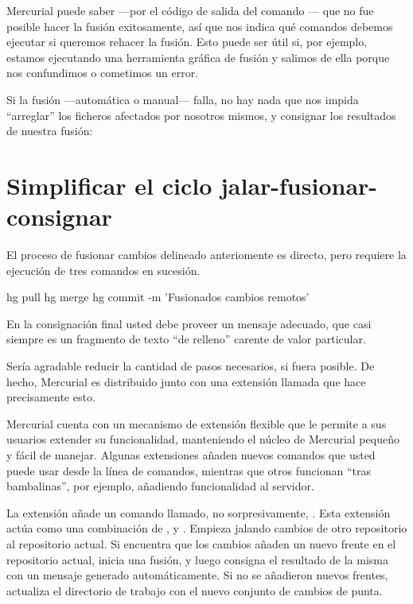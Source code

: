 Mercurial puede saber ---por el código de salida del comando
--- que no fue posible hacer la fusión exitosamente,
así que nos indica qué comandos debemos ejecutar si queremos rehacer
la fusión. Esto puede ser útil si, por ejemplo, estamos ejecutando una
herramienta gráfica de fusión y salimos de ella porque nos confundimos
o cometimos un error.

Si la fusión ---automática o manual--- falla, no hay nada que nos
impida ``arreglar'' los ficheros afectados por nosotros mismos, y
consignar los resultados de nuestra fusión:

\section{Simplificar el ciclo jalar-fusionar-consignar}
\label{sec:tour-merge:fetch}

El proceso de fusionar cambios delineado anteriomente es directo, pero
requiere la ejecución de tres comandos en sucesión.
\begin{codesample2}
  hg pull
  hg merge
  hg commit -m 'Fusionados cambios remotos'
\end{codesample2}
En la consignación final usted debe proveer un mensaje adecuado, que
casi siempre es un fragmento de texto ``de relleno'' carente de valor
particular.

Sería agradable reducir la cantidad de pasos necesarios, si fuera
posible. De hecho, Mercurial es distribuido junto con una extensión
llamada  que hace precisamente
esto.

Mercurial cuenta con un mecanismo de extensión flexible que le permite
a sus usuarios extender su funcionalidad, manteniendo el núcleo de
Mercurial pequeño y fácil de manejar. Algunas extensiones añaden
nuevos comandos que usted puede usar desde la línea de comandos,
mientras que otros funcionan ``tras bambalinas'', por ejemplo,
añadiendo funcionalidad al servidor.

La extensión  añade un comando llamado, no
sorpresivamente, .  Esta extensión actúa como una
combinación de ,  y .  Empieza
jalando cambios de otro repositorio al repositorio actual. Si
encuentra que los cambios añaden un nuevo frente en el repositorio
actual, inicia una fusión, y luego consigna el resultado de la misma
con un mensaje generado automáticamente. Si no se añadieron nuevos
frentes, actualiza el directorio de trabajo con el nuevo conjunto de
cambios de punta.

